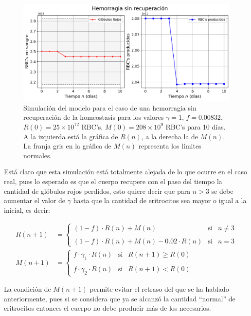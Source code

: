 \begin{figure}[H]
    \centering
    \captionsetup{justification=centering}
    \includegraphics[scale=0.534]{figures/HemoLeveG1.png}
    \caption{Simulación del modelo para el caso de una hemorragia sin recuperación de la homeostasis para los valores $\gamma = 1$, $f = 0.00832$, $R(0)=25\times 10^{12}$ RBC's, $M(0) = 208\times 10^{9}$ RBC's para 10 días. A la izquierda está la gráfica de $R(n)$, a la derecha la de $M(n)$. La franja gris en la gráfica de $M(n)$ representa los límites normales.}
    \label{sec:variaciones:fig:HemoLeveG1}
\end{figure}

Está claro que esta simulación está totalmente alejada de lo que ocurre en el caso real, pues lo esperado es que el cuerpo recupere con el paso del tiempo la cantidad de glóbulos rojos perdidos, esto quiere decir que para $n>3$ se debe aumentar el valor de $\gamma$ hasta que la cantidad de eritrocitos sea mayor o igual a la inicial, es decir:

\begin{align}\label{eq:HemoLeveBien}
    R(n+1) &= \left\{ \begin{array}{lcc} (1-f)\cdot R(n)+M(n) & \textrm{si} & n \neq 3 \\ \\ (1-f)\cdot R(n)+M(n)-0.02\cdot R(n) & \textrm{si} & n = 3\end{array} \right. \\
    M(n+1) &=\left\{ \begin{array}{lcc} f\cdot \gamma_1 \cdot R(n) & \textrm{si} & R(n+1) \geq R(0) \\ \\ f\cdot \gamma_2\cdot R(n) & \textrm{si} & R(n+1)<R(0)\end{array} \right. \nonumber
\end{align}

La condición de $M(n+1)$ permite evitar el retraso del que se ha hablado anteriormente, pues si se considera que ya se alcanzó la cantidad ``normal'' de eritrocitos entonces el cuerpo no debe producir más de los necesarios.

